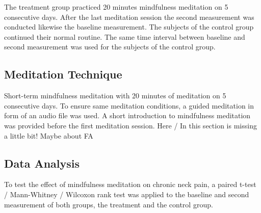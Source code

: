 The treatment group practiced 20 minutes mindfulness meditation on 5 consecutive days. After the last meditation session the second measurement was conducted likewise the baseline measurement.
The subjects of the control group continued their normal routine. The same time interval between baseline and second measurement was used for the subjects of the control group.

\subsection{Meditation Technique}
Short-term mindfulness meditation with 20 minutes of meditation on 5 consecutive days.
To ensure same meditation conditions, a guided meditation in form of an audio file was used. A short introduction to mindfulness meditation was provided before the first meditation session.
Here / In this section is missing a little bit! Maybe about FA

\subsection{Data Analysis}
To test the effect of mindfulness meditation on chronic neck pain, a paired t-test / Mann-Whitney / Wilcoxon rank test was applied to the baseline and second measurement of both groups, the treatment and the control group.

